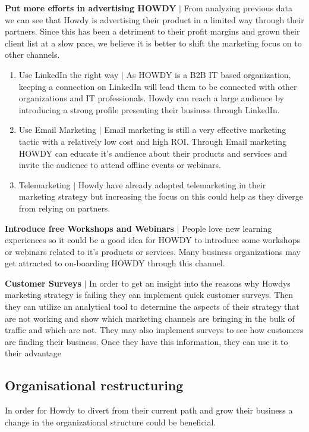\noindent \textbf{Put more efforts in advertising HOWDY} $|$ From analyzing previous data we can see that Howdy is advertising their product in a limited way through their partners. Since this has been a detriment to their profit margins and grown their client list at a slow pace, we believe it is better to shift the marketing focus on to other channels.

\begin{enumerate}
    \item Use LinkedIn the right way $|$ As HOWDY is a B2B IT based organization, keeping a connection on LinkedIn will lead them to be connected with other organizations and IT professionals. Howdy can reach a large audience by introducing a strong profile presenting their business through LinkedIn.
    \item Use Email Marketing $|$ Email marketing is still a very effective marketing tactic with a relatively low cost and high ROI. Through Email marketing HOWDY can educate it’s audience about their products and services and invite the audience to attend offline events or webinars.
    \item Telemarketing $|$ Howdy have already adopted telemarketing in their marketing strategy but increasing the focus on this could help as they diverge from relying on partners.
\end{enumerate}

\noindent \textbf{Introduce free Workshops and Webinars} $|$ People love new learning experiences so it could be a good idea for HOWDY to introduce some workshops or webinars related to it’s products or services. Many business organizations may get attracted to on-boarding HOWDY through this channel.

\noindent \textbf{Customer Surveys} $|$ In order to get an insight into the reasons why Howdys marketing strategy is failing they can implement quick customer surveys. Then they can utilize an analytical tool to determine the aspects of their strategy that are not working and show which marketing channels are bringing in the bulk of traffic and which are not. They may also implement surveys to see how customers are finding their business. Once they have this information, they can use it to their advantage

\subsection{Organisational restructuring}
In order for Howdy to divert from their current path and grow their business a change in the organizational structure could be beneficial.

